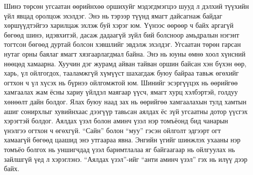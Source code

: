 Шинэ төрсөн угсаатан өөрийнхөө оршихуйг мэдэгдмэгцээ шууд л дэлхий түүхийн үйл явцад оролцож эхэлдэг. Энэ нь тэрээр түүнд ямагт дайсагнаж байдаг хөршүүдтэйгээ харилцаж эхлэж буй хэрэг юм. Үүнээс өөрөөр ч байх аргагүй бөгөөд шинэ, идэвхитэй, дасаж дадаагүй зүйл бий болсноор амьдралын нэгэнт тогтсон бөгөөд дуртай болсон хэвшлийг эвдэлж эхэлдэг. Угсаатан төрөн гарсан нутаг орны баялаг ямагт хязгаарлагдмал байна. Энэ нь юуны өмнө хоол хүнсний нөөцөд хамаарна. Хуучин дэг журамд айван тайван оршин байсан хэн бүхэн өөр, харь, үл ойлгогдох, тааламжгүй хүмүүст шахагдаж буюу байраа тавьж өгөхийг огтхон ч үл хүсэх нь бүрнээ ойлгомжтой юм. Шинийг эсэргүүцэх нь өөрийгөө хамгаалах жам ёсны хариу үйлдэл маягаар үүсч, ямагт хурц хэлбэртэй, голдуу хөнөөлт дайн болдог. Ялах буюу наад зах нь өөрийгөө хамгаалахын тулд хамтын ашиг сонирхлыг хувийнхаас дээгүүр тавьсан аялдах ёс зүй угсаатны дотор үүсгэх хэрэгтэй болдог.
Аялдах үзэл болон аминч үзэл нэр томъёонд бид чанарын үнэлгээ огтхон ч өгөхгүй. “Сайн” болон “муу” гэсэн ойлголт эдгээрт огт хамаагүй бөгөөд цаашид энэ утгаараа явна. Энгийн үгийг шинжлэх ухааны нэр томъёо болгох нь уншигчдад үзэл баримтлалаа яг байгаагаар нь ойлгуулах нь зайлшгүй үед л хэрэглэнэ. “Аялдах үзэл”-ийг “анти аминч үзэл” гэх нь илүү дээр байх.
